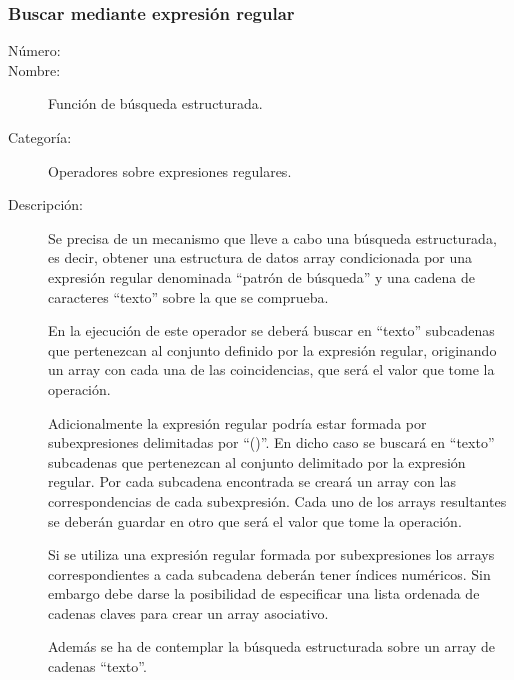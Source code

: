 \subsubsection{Buscar mediante expresión regular}
\begin{framed}
	\begin{description}
		\item [Número:] \cn
		\item [Nombre:] Función de búsqueda estructurada.
		\item [Categoría:] Operadores sobre expresiones regulares.
		\item [Descripción:] Se precisa de un mecanismo que lleve a cabo una búsqueda estructurada, es decir,
		obtener una estructura de datos array condicionada por una expresión regular denominada
		``patrón de búsqueda'' y una cadena de caracteres ``texto'' sobre la que se comprueba.

		En la ejecución de este operador se deberá
		buscar en ``texto'' subcadenas que pertenezcan al conjunto definido por la expresión regular, originando
		un array con cada una de las coincidencias, que será el valor que tome la operación.
		
		Adicionalmente la expresión regular podría estar formada por subexpresiones delimitadas
		por ``()''. En dicho caso se buscará en ``texto'' subcadenas que pertenezcan al
		conjunto delimitado por la expresión regular. Por cada subcadena encontrada se creará un array
		con las correspondencias de cada subexpresión. Cada uno de los arrays resultantes se
		deberán guardar en otro que será el valor que tome la operación.
		
		Si se utiliza una expresión regular formada por subexpresiones los arrays correspondientes
		a cada subcadena deberán tener índices numéricos. Sin embargo debe darse la posibilidad de
		especificar una lista ordenada de cadenas claves para crear un array asociativo.
 
		Además se ha de contemplar la búsqueda estructurada sobre un array de cadenas ``texto''.
	\end {description}
\end{framed}
